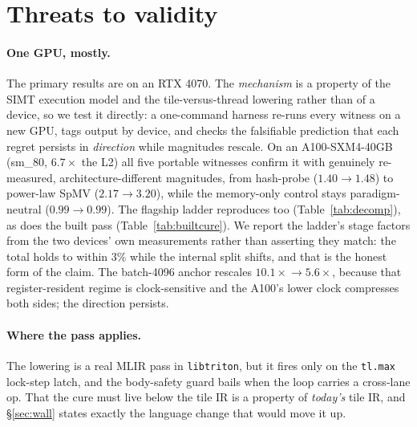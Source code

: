 \documentclass[sigplan,review,nonacm,10pt]{acmart}
\begin{document}
\section{Threats to validity}\label{sec:threats}

\paragraph{One GPU, mostly.} The primary results are on an RTX 4070. The \emph{mechanism}
is a property of the SIMT execution model and the tile-versus-thread lowering rather than
of a device, so we test it directly: a one-command harness re-runs every witness on a new
GPU, tags output by device, and checks the falsifiable prediction that each regret persists
in \emph{direction} while magnitudes rescale. On an A100-SXM4-40GB (sm\_80, $6.7\times$ the
L2) all five portable witnesses confirm it with genuinely re-measured, architecture-different
magnitudes, from hash-probe ($1.40\!\to\!1.48$) to power-law SpMV
($2.17\!\to\!3.20$), while the memory-only control stays paradigm-neutral
($0.99\!\to\!0.99$). The flagship ladder reproduces too
(Table~\ref{tab:decomp}), as does the built pass (Table~\ref{tab:builtcure}). We report
the ladder's stage factors from the two devices' own measurements rather than asserting
they match: the total holds to within $3\%$ while the internal split shifts, and that is
the honest form of the claim. The
batch-4096 anchor rescales $10.1\times\!\to\!5.6\times$, because that register-resident
regime is clock-sensitive and the A100's lower clock compresses both sides; the direction
persists.

\paragraph{Where the pass applies.} The lowering is a real MLIR pass in \texttt{libtriton},
but it fires only on the \texttt{tl.max} lock-step latch, and the body-safety guard bails
when the loop carries a cross-lane op. That the cure must live below the tile IR is a
property of \emph{today's} tile IR, and \S\ref{sec:wall} states exactly the language change
that would move it up.
\end{document}
